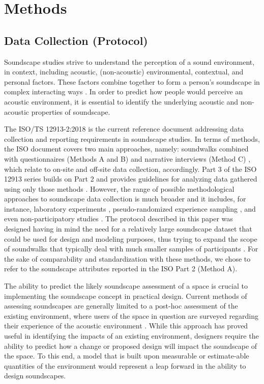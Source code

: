 \chapter{Methods}
\label{ch:methods}

\section{Data Collection (Protocol)}
 Soundscape studies strive to understand the perception of a sound environment, in context, including acoustic, (non-acoustic) environmental, contextual, and personal factors. These factors combine together to form a person's soundscape in complex interacting ways \citep{Berglund2006Tool}. In order to predict how people would perceive an acoustic environment, it is essential to identify the underlying acoustic and non-acoustic properties of soundscape.

 The ISO/TS 12913-2:2018 is the current reference document addressing data collection and reporting requirements in soundscape studies. In terms of methods, the ISO document covers two main approaches, namely: soundwalks combined with questionnaires (Methods A and B) and narrative interviews (Method C) \citep{ISO12913_2_2018IOS}, which relate to on-site and off-site data collection, accordingly. Part 3 of the ISO 12913 series builds on Part 2 and provides guidelines for analyzing data gathered using only those methods \citep{ISO12913_3_2019IOS}. However, the range of possible methodological approaches to soundscape data collection is much broader and it includes, for instance, laboratory experiments \citep{Aletta2016Soundscape,Sun2019Classification,Oberman2018Towards}, pseudo-randomized experience sampling \citep{Craig2017Experience}, and even non-participatory studies \citep{Lavia2018Non}. The protocol described in this paper was designed having in mind the need for a relatively large soundscape dataset that could be used for design and modeling purposes, thus trying to expand the scope of soundwalks that typically deal with much smaller samples of participants \citep{Engel2018Review}. For the sake of comparability and standardization with these methods, we chose to refer to the soundscape attributes reported in the ISO Part 2 (Method A).


 The ability to predict the likely soundscape assessment of a space is crucial to implementing the soundscape concept in practical design. Current methods of assessing soundscapes are generally limited to a post-hoc assessment of the existing environment, where users of the space in question are surveyed regarding their experience of the acoustic environment \citep{Engel2018Review, Zhang2018Effect}. While this approach has proved useful in identifying the impacts of an existing environment, designers require the ability to predict how a change or proposed design will impact the soundscape of the space. To this end, a model that is built upon measurable or estimate-able quantities of the environment would represent a leap forward in the ability to design soundscapes.


